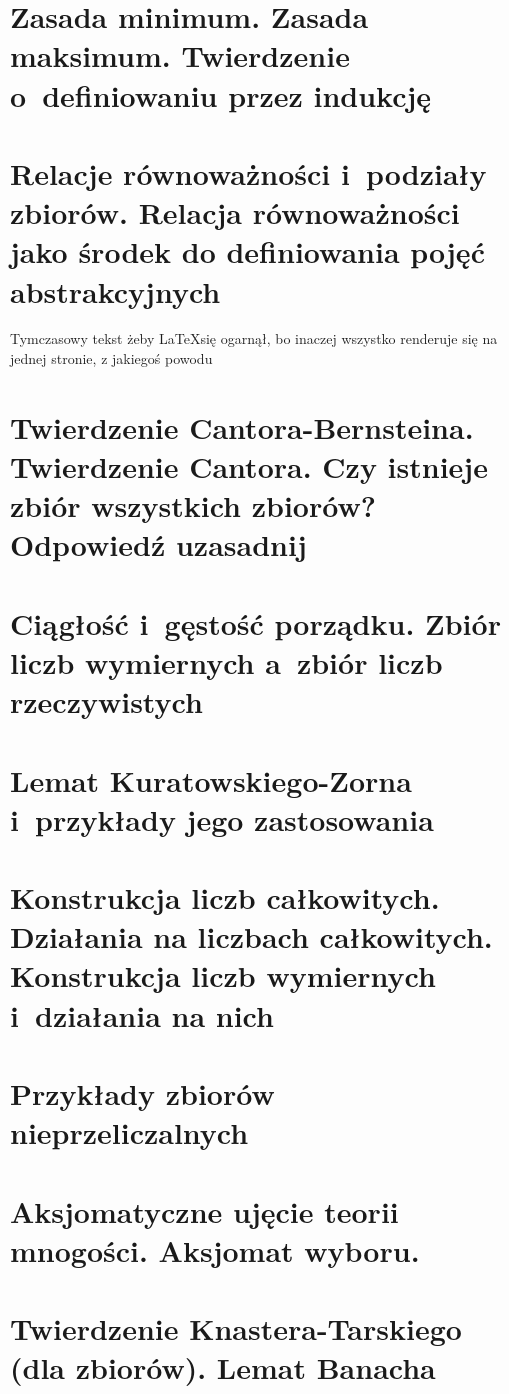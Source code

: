 \section{Zasada minimum. Zasada maksimum. Twierdzenie o~definiowaniu przez indukcję}

\section{Relacje równoważności i~podziały zbiorów. Relacja równoważności jako środek do definiowania pojęć abstrakcyjnych}

Tymczasowy tekst żeby \LaTeX się ogarnął, bo inaczej wszystko renderuje się na jednej stronie, z jakiegoś powodu

\section{Twierdzenie Cantora-Bernsteina. Twierdzenie Cantora. Czy istnieje zbiór wszystkich zbiorów? Odpowiedź uzasadnij}


\section{Ciągłość i~gęstość porządku. Zbiór liczb wymiernych a~zbiór liczb rzeczywistych}

\section{Lemat Kuratowskiego-Zorna i~przykłady jego zastosowania}

\section{Konstrukcja liczb całkowitych. Działania na liczbach całkowitych. Konstrukcja liczb wymiernych i~działania na nich}

\section{Przykłady zbiorów nieprzeliczalnych}

\section{Aksjomatyczne ujęcie teorii mnogości. Aksjomat wyboru.}

\section{Twierdzenie Knastera-Tarskiego (dla zbiorów). Lemat Banacha}
\label{mfi:knaster_tarski_and_banach}


